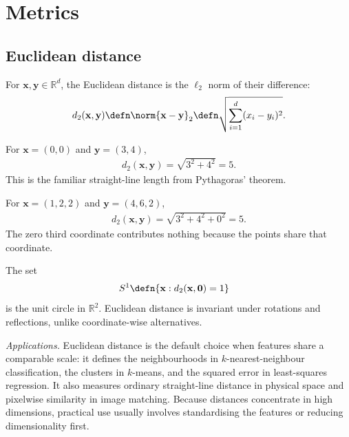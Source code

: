 \documentclass[a4paper, 12pt]{book}
\begin{document}
\section{Metrics}

\subsection{Euclidean distance}
\begin{definition}
    For $\mathbf{x},\mathbf{y}\in\mathbb{R}^d$, the Euclidean distance is the $\ell_2$ norm of their difference:
    \begin{align}
        d_2(\mathbf{x},\mathbf{y}) \defn \norm{\mathbf{x}-\mathbf{y}}_2
        \defn \sqrt{\sum_{i=1}^d (x_i-y_i)^2}.
    \end{align}
\end{definition}

\begin{example}
    For $\mathbf{x}=(0,0)$ and $\mathbf{y}=(3,4)$,
    \begin{align}
        d_2(\mathbf{x},\mathbf{y})=\sqrt{3^2+4^2}=5.
    \end{align}
    This is the familiar straight-line length from Pythagoras' theorem.
\end{example}

\begin{example}
    For $\mathbf{x}=(1,2,2)$ and $\mathbf{y}=(4,6,2)$,
    \begin{align}
        d_2(\mathbf{x},\mathbf{y})=\sqrt{3^2+4^2+0^2}=5.
    \end{align}
    The zero third coordinate contributes nothing because the points share that coordinate.
\end{example}

\begin{example}
    The set 
    \begin{align}
        S^1 &\defn \{\mathbf{x}:d_2(\mathbf{x},\mathbf{0})=1\}    
    \end{align}
    is the unit circle in $\mathbb{R}^2$. Euclidean distance is invariant under rotations and reflections, unlike coordinate-wise alternatives.
\end{example}

\emph{Applications.} Euclidean distance is the default choice when features share a comparable scale: it defines the neighbourhoods in $k$-nearest-neighbour classification, the clusters in $k$-means, and the squared error in least-squares regression. It also measures ordinary straight-line distance in physical space and pixelwise similarity in image matching. Because distances concentrate in high dimensions, practical use usually involves standardising the features or reducing dimensionality first.
\end{document}
